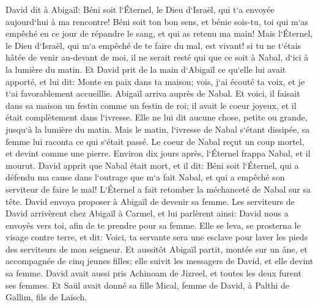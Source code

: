 \verse David dit à Abigaïl: Béni soit l`Éternel, le Dieu d`Israël, qui t`a envoyée aujourd`hui à ma rencontre! 
\verse Béni soit ton bon sens, et bénie sois-tu, toi qui m`as empêché en ce jour de répandre le sang, et qui as retenu ma main! 
\verse Mais l`Éternel, le Dieu d`Israël, qui m`a empêché de te faire du mal, est vivant! si tu ne t`étais hâtée de venir au-devant de moi, il ne serait resté qui que ce soit à Nabal, d`ici à la lumière du matin. 
\verse Et David prit de la main d`Abigaïl ce qu`elle lui avait apporté, et lui dit: Monte en paix dans ta maison; vois, j`ai écouté ta voix, et je t`ai favorablement accueillie. 
\verse Abigaïl arriva auprès de Nabal. Et voici, il faisait dans sa maison un festin comme un festin de roi; il avait le coeur joyeux, et il était complètement dans l`ivresse. Elle ne lui dit aucune chose, petite ou grande, jusqu`à la lumière du matin. 
\verse Mais le matin, l`ivresse de Nabal s`étant dissipée, sa femme lui raconta ce qui s`était passé. Le coeur de Nabal reçut un coup mortel, et devint comme une pierre. 
\verse Environ dix jours après, l`Éternel frappa Nabal, et il mourut. 
\verse David apprit que Nabal était mort, et il dit: Béni soit l`Éternel, qui a défendu ma cause dans l`outrage que m`a fait Nabal, et qui a empêché son serviteur de faire le mal! L`Éternel a fait retomber la méchanceté de Nabal sur sa tête. David envoya proposer à Abigaïl de devenir sa femme. 
\verse Les serviteurs de David arrivèrent chez Abigaïl à Carmel, et lui parlèrent ainsi: David nous a envoyés vers toi, afin de te prendre pour sa femme. 
\verse Elle se leva, se prosterna le visage contre terre, et dit: Voici, ta servante sera une esclave pour laver les pieds des serviteurs de mon seigneur. 
\verse Et aussitôt Abigaïl partit, montée sur un âne, et accompagnée de cinq jeunes filles; elle suivit les messagers de David, et elle devint sa femme. 
\verse David avait aussi pris Achinoam de Jizreel, et toutes les deux furent ses femmes. 
\verse Et Saül avait donné sa fille Mical, femme de David, à Palthi de Gallim, fils de Laïsch. 

\chapter{}

